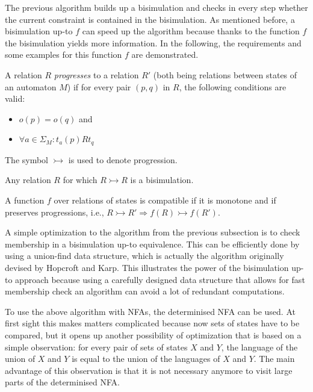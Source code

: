The previous algorithm builds up a bisimulation and checks in every step whether
the current constraint is contained in the bisimulation.
As mentioned before, a bisimulation up-to $f$ can speed up the algorithm
because thanks to the function $f$ the bisimulation yields more information.
In the following, the requirements and some examples for this function $f$ are demonstrated.

\begin{definition}
    A relation $R$ \textit{progresses} to a relation $R'$
    (both being relations between states of an automaton $M$)
    if for every pair $(p, q)$ in $R$, the following conditions are valid:

    \begin{itemize}
        \item $o(p) = o(q)$ and
        \item $\forall a \in \Sigma_M: t_a(p) R t_{q}$
    \end{itemize}

    The symbol $\rightarrowtail$ is used to denote progression.
\end{definition}

\begin{example}
    Any relation $R$ for which $R \rightarrowtail R$ is a bisimulation.
\end{example}

\begin{definition}
    A function $f$ over relations of states is compatible if it is monotone and if
    preserves progressions, i.e., $R \rightarrowtail R' \Rightarrow f(R) \rightarrowtail f(R')$.
\end{definition}

A simple optimization to the algorithm from the previous subsection is
to check membership in a bisimulation up-to equivalence.
This can be efficiently done by using a union-find data structure, which
is actually the algorithm originally devised by Hopcroft and Karp.
This illustrates the power of the bisimulation up-to approach because
using a carefully designed data structure that allows for fast membership check
an algorithm can avoid a lot of redundant computations.


To use the above algorithm with NFAs, the determinised NFA can be used.
At first sight this makes matters complicated because now sets of states
have to be compared, but it opens up another possibility of optimization
that is based on a simple observation:
for every pair of sets of states $X$ and $Y$,
the language of the union of $X$ and $Y$ is equal to
the union of the languages of $X$ and $Y$.
The main advantage of this observation is that it is not necessary anymore
to visit large parts of the determinised NFA.

